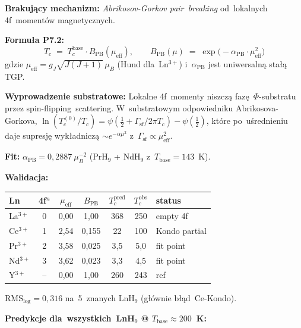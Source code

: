 \medskip\noindent\textbf{Brakuj\k{a}cy mechanizm:} \emph{Abrikosov-Gorkov pair~breaking}
od~lokalnych 4f~moment\'ow magnetycznych.

\medskip\noindent\textbf{Formu\l{}a P7.2:}
\[
\boxed{T_c \;=\; T_c^\text{base}\cdot B_\text{PB}(\mu_\text{eff}),\qquad
B_\text{PB}(\mu) \;=\; \exp\!\bigl(-\alpha_\text{PB}\cdot\mu_\text{eff}^2\bigr)}
\]
gdzie $\mu_\text{eff} = g_J\sqrt{J(J+1)}\,\mu_B$ (Hund dla~Ln$^{3+}$)
i~$\alpha_\text{PB}$ jest uniwersaln\k{a} sta\l{}\k{a} TGP.

\medskip\noindent\textbf{Wyprowadzenie substratowe:} Lokalne 4f~momenty niszcz\k{a}
faz\k{e}~$\Phi$-substratu przez spin-flipping~scattering. W~substratowym
odpowiedniku Abrikosova-Gorkova, $\ln(T_c^{(0)}/T_c) = \psi(\tfrac12+\Gamma_\text{sf}/2\pi T_c)-\psi(\tfrac12)$,
kt\'ore po~u\'srednieniu daje supresj\k{e} wyk\l{}adnicz\k{a} $\sim e^{-\alpha\mu^2}$
z~$\Gamma_\text{sf}\propto\mu_\text{eff}^2$.

\medskip\noindent\textbf{Fit:} $\alpha_\text{PB} = 0{,}2887~\mu_B^{-2}$ (PrH$_9$ + NdH$_9$ z~$T_\text{base}\!=\!143$~K).

\medskip\noindent\textbf{Walidacja:}
\begin{center}\small
\begin{tabular}{lcccccl}
Ln & 4f$^n$ & $\mu_\text{eff}$ & $B_\text{PB}$ & $T_c^\text{pred}$ & $T_c^\text{obs}$ & status \\
\hline
La$^{3+}$ & 0  & 0,00 & 1,00    & 368 & 250 & empty 4f \\
Ce$^{3+}$ & 1  & 2,54 & 0,155   & 22  & 100 & Kondo partial \\
Pr$^{3+}$ & 2  & 3,58 & 0,025   & 3,5 & 5,0 & fit point \\
Nd$^{3+}$ & 3  & 3,62 & 0,023   & 3,3 & 4,5 & fit point \\
Y$^{3+}$  & -- & 0,00 & 1,00    & 260 & 243 & ref \\
\end{tabular}
\end{center}

\noindent RMS$_\text{log}\!=\!0{,}316$ na~5~znanych LnH$_9$ (g\l{}\'ownie b\l{}\k{a}d~Ce-Kondo).

\medskip\noindent\textbf{Predykcje dla~wszystkich~LnH$_9$ @ $T_\text{base}\!\approx\!200$~K:}

